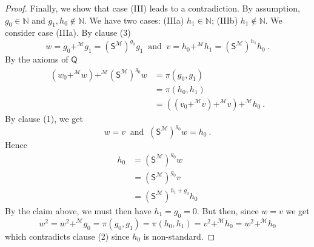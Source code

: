 \documentclass[10pt,a4paper, openany,  oldfontcommands]{memoir}
\newtheorem{open problem} [theorem] {Open Problem}
\newtheorem{open question} [theorem] {Open Question}
\renewcommand{\mathrm}{\mathsf}
\begin{document}
\begin{proof}
Finally, we  show that  case (III) leads to a contradiction. 
By assumption,  $ g_0  \in  \mathbb{N} $  and  $   g_1, h_0  \not\in  \mathbb{N}  $. 
We have two cases: (IIIa) $  h_1  \in  \mathbb{N} $; 
(IIIb)    $  h_1    \not\in  \mathbb{N} $.
We consider case (IIIa). 
By clause (3) 
\[
w  =   g_0  +^{  \mathcal{M} }   g_1  =    \left(  \mathrm{S}^{   \mathcal{M} }  \right)^{ g_0 }    g_1  
\    \mbox{  and  }    \   
v  =   h_0  +^{  \mathcal{M} }   h_1  =    \left(  \mathrm{S}^{   \mathcal{M} }  \right)^{ h_1 }    h_0  
\      .
\]
By the axioms of  $  \mathsf{Q} $
\begin{align*}
    \left( w_0   +^{  \mathcal{M} }  w   \right)     +^{  \mathcal{M} }    \left(  \mathrm{S}^{   \mathcal{M} }  \right)^{ g_0 }  w 
&=    \pi  ( g_0, g_1)  
\\
&  =   \pi   (h_0, h_1) 
\\
&=   \left( \left( v_0   +^{  \mathcal{M} }  v   \right)     +^{  \mathcal{M} }   v   \right)    +^{  \mathcal{M} }   h_0  
\      .
\end{align*}
By clause (1),   we get 
 \[
 w  =  v    
 \    \mbox{  and   }    \   
  \left(  \mathrm{S}^{   \mathcal{M} }  \right)^{ g_0 }  w    =   h_0 
  \     .
 \]
 Hence 
\begin{align*}
h_0 
&=    \left(  \mathrm{S}^{   \mathcal{M} }  \right)^{ g_0 }  w  
\\
&  =   \left(  \mathrm{S}^{   \mathcal{M} }  \right)^{ g_0 }  v  
\\
&=   \left(  \mathrm{S}^{   \mathcal{M} }  \right)^{ h_1 + g_0  }    h_0  
\end{align*}
By the claim above, we must then have $ h_1  = g_0 = 0 $. 
But then, since  $  w  = v $  we  get  
\[
w^2  =   w^2  +^{   \mathcal{M} }  g_0  =  \pi   (g_0, g_1)  =  \pi   ( h_0, h_1)  =   v^2    +^{   \mathcal{M} }  h_0 
=   w^2    +^{   \mathcal{M} }  h_0 
\]
which contradicts clause (2)  since  $ h_0$ is non-standard.






\end{proof}
\end{document}
